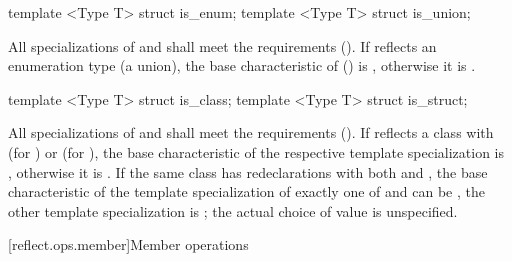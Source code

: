 \begin{std.txt}
\begin{itemdecl}
template <Type T> struct is_enum;
template <Type T> struct is_union;
\end{itemdecl}

\begin{itemdescr}
\pnum
All specializations of  and  shall meet the  requirements (). If  reflects an enumeration type (a union), the base characteristic of  () is , otherwise it is .
\end{itemdescr}

\begin{itemdecl}
template <Type T> struct is_class;
template <Type T> struct is_struct;
\end{itemdecl}

\begin{itemdescr}
\pnum
All specializations of  and  shall meet the  requirements (). If  reflects a class with   (for ) or  (for ), the base characteristic of the respective template specialization is , otherwise it is . If the same class has redeclarations with both   and  , the base characteristic of the template specialization of exactly one of  and  can be , the other template specialization is ; the actual choice of value is unspecified.
\end{itemdescr}
\end{std.txt}

[reflect.ops.member]{Member operations}

